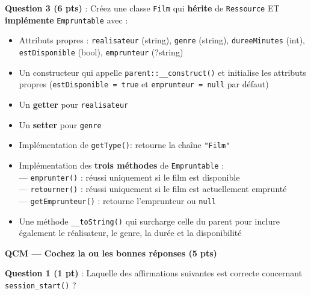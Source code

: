 \documentclass[11pt,a4paper]{article}
\newcommand{\answerbox}[1]{%
  \begin{mdframed}[
    linecolor=answerframe,
    linewidth=0.5pt,
    backgroundcolor=answerbg,
    innertopmargin=6pt,
    innerbottommargin=#1,
    innerleftmargin=6pt,
    innerrightmargin=6pt,
    skipabove=4pt,
    skipbelow=6pt,
  ]
  \phantom{x}
  \end{mdframed}
}
\begin{document}
\answerbox{80pt}

\noindent\textbf{Question 3 (6 pts)} : Créez une classe \texttt{Film} qui \textbf{hérite} de \texttt{Ressource} ET \textbf{implémente} \texttt{Empruntable} avec :
\begin{itemize}[itemsep=1pt, topsep=2pt]
  \item Attributs propres : \texttt{realisateur} (string), \texttt{genre} (string), \texttt{dureeMinutes} (int), \texttt{estDisponible} (bool), \texttt{emprunteur} (?string)
  \item Un constructeur qui appelle \texttt{parent::\_\_construct()} et initialise les attributs propres (\texttt{estDisponible = true} et \texttt{emprunteur = null} par défaut)
  \item Un \textbf{getter} pour \texttt{realisateur}
  \item Un \textbf{setter} pour \texttt{genre}
  \item Implémentation de \texttt{getType()}: retourne la chaîne \texttt{"Film"}
  \item Implémentation des \textbf{trois méthodes} de \texttt{Empruntable} :\\
    --- \texttt{emprunter()} : réussi uniquement si le film est disponible\\
    --- \texttt{retourner()} : réussi uniquement si le film est actuellement emprunté\\
    --- \texttt{getEmprunteur()} : retourne l'emprunteur ou \texttt{null}
  \item Une méthode \texttt{\_\_toString()} qui surcharge celle du parent pour inclure également le réalisateur, le genre, la durée et la disponibilité
\end{itemize}

\answerbox{210pt}

\newpage

\begin{center}
  {\Large\bfseries QCM --- Cochez la ou les bonnes réponses \hspace{1em} (5 pts)}
\end{center}

\vspace{8pt}

\noindent\textbf{Question 1 (1 pt)} : Laquelle des affirmations suivantes est correcte concernant \texttt{session\_start()} ?
\end{document}
